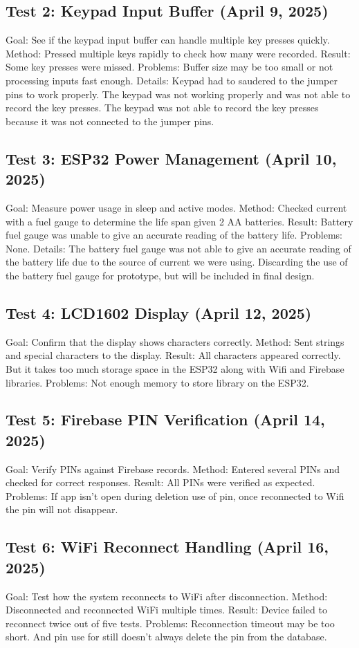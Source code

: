 \documentclass{article}
\begin{document}
\subsection*{Test 2: Keypad Input Buffer (April 9, 2025)}
Goal: See if the keypad input buffer can handle multiple key presses quickly.
Method: Pressed multiple keys rapidly to check how many were recorded.
Result: Some key presses were missed.
Problems: Buffer size may be too small or not processing inputs fast enough.
Details: Keypad had to saudered to the jumper pins to work properly. The keypad was not working properly and was not able to record the key presses. The keypad was not able to record the key presses because it was not connected to the jumper pins. 

\subsection*{Test 3: ESP32 Power Management (April 10, 2025)}
Goal: Measure power usage in sleep and active modes.
Method: Checked current with a fuel gauge to determine the life span given 2 AA batteries.
Result: Battery fuel gauge was unable to give an accurate reading of the battery life.
Problems: None.
Details: The battery fuel gauge was not able to give an accurate reading of the battery life due to the source of current we were using. Discarding the use of the battery fuel gauge for prototype, but will be included in final design.

\subsection*{Test 4: LCD1602 Display (April 12, 2025)}
Goal: Confirm that the display shows characters correctly.
Method: Sent strings and special characters to the display.
Result: All characters appeared correctly. But it takes too much storage space in the ESP32 along with Wifi and Firebase libraries.
Problems: Not enough memory to store library on the ESP32.

\subsection*{Test 5: Firebase PIN Verification (April 14, 2025)}
Goal: Verify PINs against Firebase records.
Method: Entered several PINs and checked for correct responses.
Result: All PINs were verified as expected.
Problems: If app isn't open during deletion use of pin, once reconnected to Wifi the pin will not disappear.

\subsection*{Test 6: WiFi Reconnect Handling (April 16, 2025)}
Goal: Test how the system reconnects to WiFi after disconnection.
Method: Disconnected and reconnected WiFi multiple times.
Result: Device failed to reconnect twice out of five tests.
Problems: Reconnection timeout may be too short. And pin use for still doesn't always delete the pin from the database.
\end{document}
